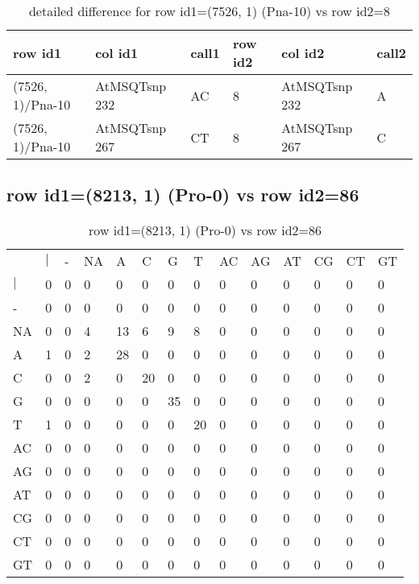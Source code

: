 \begin{center}
\begin{longtable}{|l|l|l|l|l|l|}
\caption{detailed difference for row id1=(7526, 1) (Pna-10) vs row id2=8} \label{table_dm341}\\
\hline
row id1&col id1&call1&row id2&col id2&call2\\
\hline
(7526, 1)/Pna-10&AtMSQTsnp 232&AC&8&AtMSQTsnp 232&A\\
(7526, 1)/Pna-10&AtMSQTsnp 267&CT&8&AtMSQTsnp 267&C\\
\hline
\end{longtable}
\end{center}

\subsection{row id1=(8213, 1) (Pro-0) vs row id2=86}
\begin{center}
\begin{longtable}{|l|l|l|l|l|l|l|l|l|l|l|l|l|l|}
\caption{row id1=(8213, 1) (Pro-0) vs row id2=86} \label{table_dm342}\\
\hline
\\
\hline
&$|$&-&NA&A&C&G&T&AC&AG&AT&CG&CT&GT\\
$|$&0&0&0&0&0&0&0&0&0&0&0&0&0\\
-&0&0&0&0&0&0&0&0&0&0&0&0&0\\
NA&0&0&4&13&6&9&8&0&0&0&0&0&0\\
A&1&0&2&28&0&0&0&0&0&0&0&0&0\\
C&0&0&2&0&20&0&0&0&0&0&0&0&0\\
G&0&0&0&0&0&35&0&0&0&0&0&0&0\\
T&1&0&0&0&0&0&20&0&0&0&0&0&0\\
AC&0&0&0&0&0&0&0&0&0&0&0&0&0\\
AG&0&0&0&0&0&0&0&0&0&0&0&0&0\\
AT&0&0&0&0&0&0&0&0&0&0&0&0&0\\
CG&0&0&0&0&0&0&0&0&0&0&0&0&0\\
CT&0&0&0&0&0&0&0&0&0&0&0&0&0\\
GT&0&0&0&0&0&0&0&0&0&0&0&0&0\\
\hline
\end{longtable}
\end{center}

